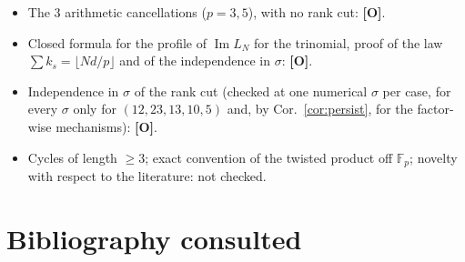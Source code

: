 \documentclass[11pt,a4paper]{article}
\newcommand{\F}{\mathbb{F}}
\begin{document}
\begin{itemize}
\item The $3$ arithmetic cancellations ($p=3,5$), with no rank cut: \textbf{[O]}.
\item Closed formula for the profile of $\operatorname{Im}L_N$ for the trinomial,
proof of the law $\sum k_s=\lfloor Nd/p\rfloor$ and of the independence in
$\sigma$: \textbf{[O]}.
\item Independence in $\sigma$ of the rank cut (checked at one numerical $\sigma$
per case, for every $\sigma$ only for $(12,23,13,10,5)$ and, by
Cor.~\ref{cor:persist}, for the factor-wise mechanisms): \textbf{[O]}.
\item Cycles of length $\ge3$; exact convention of the twisted product off $\F_p$;
novelty with respect to the literature: not checked.
\end{itemize}

\section{Bibliography consulted}
\end{document}
